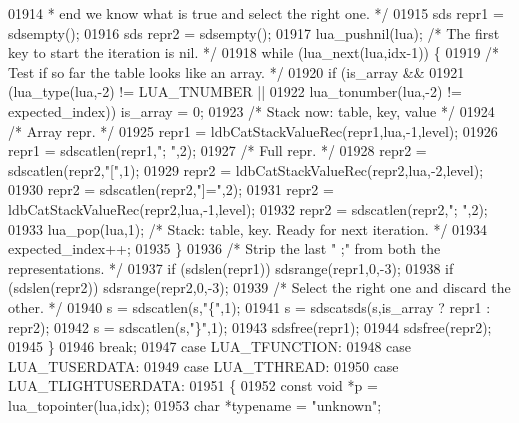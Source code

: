 \begin{DoxyCode}
{{{{{{{{{{{{{{{{01914 \textcolor{comment}{         * end we know what is true and select the right one. */}
01915         sds repr1 = sdsempty();
01916         sds repr2 = sdsempty();
01917         lua\_pushnil(lua); \textcolor{comment}{/* The first key to start the iteration is nil. */}
01918         \textcolor{keywordflow}{while} (lua\_next(lua,idx-1)) \{
01919             \textcolor{comment}{/* Test if so far the table looks like an array. */}
01920             \textcolor{keywordflow}{if} (is\_array &&
01921                 (lua\_type(lua,-2) != LUA\_TNUMBER ||
01922                  lua\_tonumber(lua,-2) != expected\_index)) is\_array = 0;
01923             \textcolor{comment}{/* Stack now: table, key, value */}
01924             \textcolor{comment}{/* Array repr. */}
01925             repr1 = ldbCatStackValueRec(repr1,lua,-1,level);
01926             repr1 = sdscatlen(repr1,\textcolor{stringliteral}{"; "},2);
01927             \textcolor{comment}{/* Full repr. */}
01928             repr2 = sdscatlen(repr2,\textcolor{stringliteral}{"["},1);
01929             repr2 = ldbCatStackValueRec(repr2,lua,-2,level);
01930             repr2 = sdscatlen(repr2,\textcolor{stringliteral}{"]="},2);
01931             repr2 = ldbCatStackValueRec(repr2,lua,-1,level);
01932             repr2 = sdscatlen(repr2,\textcolor{stringliteral}{"; "},2);
01933             lua\_pop(lua,1); \textcolor{comment}{/* Stack: table, key. Ready for next iteration. */}
01934             expected\_index++;
01935         \}
01936         \textcolor{comment}{/* Strip the last " ;" from both the representations. */}
01937         \textcolor{keywordflow}{if} (sdslen(repr1)) sdsrange(repr1,0,-3);
01938         \textcolor{keywordflow}{if} (sdslen(repr2)) sdsrange(repr2,0,-3);
01939         \textcolor{comment}{/* Select the right one and discard the other. */}
01940         s = sdscatlen(s,\textcolor{stringliteral}{"\{"},1);
01941         s = sdscatsds(s,is\_array ? repr1 : repr2);
01942         s = sdscatlen(s,\textcolor{stringliteral}{"\}"},1);
01943         sdsfree(repr1);
01944         sdsfree(repr2);
01945         \}
01946         \textcolor{keywordflow}{break};
01947     \textcolor{keywordflow}{case} LUA\_TFUNCTION:
01948     \textcolor{keywordflow}{case} LUA\_TUSERDATA:
01949     \textcolor{keywordflow}{case} LUA\_TTHREAD:
01950     \textcolor{keywordflow}{case} LUA\_TLIGHTUSERDATA:
01951         \{
01952         \textcolor{keyword}{const} \textcolor{keywordtype}{void} *p = lua\_topointer(lua,idx);
01953         \textcolor{keywordtype}{char} *\textcolor{keyword}{typename} = \textcolor{stringliteral}{"unknown"};
}}}}}}}}}}}}}}}}
\end{DoxyCode}
